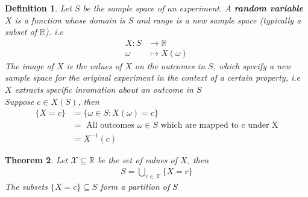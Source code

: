 \documentclass[11pt,oneside]{book}
\theoremstyle{newStyle}
\newtheorem{thm}{Theorem}[chapter]
\newtheorem{defn}[thm]{Definition}
\newcommand{\R}{\mathbb{R}}
\newcommand{\X}{\mathcal{X}}
\begin{document}
\begin{defn}
Let $S$ be the sample space of an experiment. A \textbf{random variable} $X$ is a function whose domain is $S$ and range is a new sample space (typically a subset of $\R$). i.e \begin{align*}
X:S&\longrightarrow \R\\
\omega &\mapsto X(\omega)
\end{align*}
The image of $X$ is the values of $X$ on the outcomes in $S$, which specify a new sample space for the original experiment in the context of a certain property, i.e $X$ extracts specific inromation about an outcome in $S$\\
Suppose $c\in X(S)$, then \begin{align*}
\{X=c\}&=\{\omega \in S:X(\omega)=c\}\\
&=\text{ All outcomes }\omega \in S\text{ which are mapped to c under X}\\
&=X^{-1}(c)
\end{align*} 
\end{defn}
\begin{thm}
Let $\X\subseteq \R$ be the set of values of $X$, then \begin{align*}
S=\bigcup_{c\in \X}\{X=c\}
\end{align*}
The subsets $\{X=c\}\subseteq S$ form a partition of $S$
\end{thm}
\end{document}
